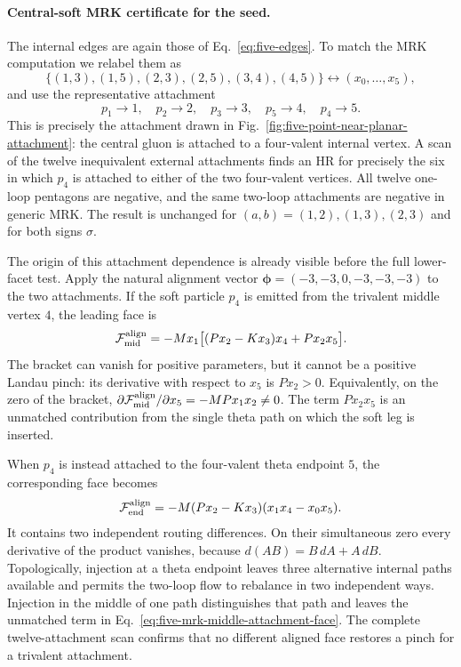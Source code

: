 \documentclass[a4paper,11pt]{article}
\begin{document}
\paragraph{Central-soft MRK certificate for the seed.}

The internal edges are again those of Eq.~\eqref{eq:five-edges}.  To match
the MRK computation we relabel them as
\begin{equation}
 \{(1,3),(1,5),(2,3),(2,5),(3,4),(4,5)\}
 \longleftrightarrow(x_0,\ldots,x_5),
 \label{eq:five-mrk-edges}
\end{equation}
and use the representative attachment
\begin{equation}
 p_1\to1,\quad p_2\to2,\quad p_3\to3,\quad
 p_5\to4,\quad p_4\to5.
 \label{eq:five-mrk-attachments}
\end{equation}
This is precisely the attachment drawn in
Fig.~\ref{fig:five-point-near-planar-attachment}: the central gluon is
attached to a four-valent internal vertex.  A scan of the twelve
inequivalent external attachments finds an HR
for precisely the six in which \(p_4\) is attached to either of the two
four-valent vertices.  All twelve one-loop pentagons are negative, and the
same two-loop attachments are negative in generic MRK.  The result is
unchanged for \((a,b)=(1,2),(1,3),(2,3)\) and for both signs \(\sigma\).

The origin of this attachment dependence is already visible before the
full lower-facet test.  Apply the natural alignment vector
\(\boldsymbol\phi=(-3,-3,0,-3,-3,-3)\) to the two attachments.  If the
soft particle \(p_4\) is emitted from the trivalent middle vertex \(4\), the
leading face is
\begin{equation}
 \mathcal F_{\rm mid}^{\rm align}
 =-Mx_1\big[(Px_2-Kx_3)x_4+Px_2x_5\big].
 \label{eq:five-mrk-middle-attachment-face}
\end{equation}
The bracket can vanish for positive parameters, but it cannot be a positive
Landau pinch: its derivative with respect to \(x_5\) is \(Px_2>0\).
Equivalently, on the zero of the bracket,
\(\partial\mathcal F_{\rm mid}^{\rm align}/\partial x_5=-MPx_1x_2\ne0\).
The term \(Px_2x_5\) is an unmatched contribution from the single theta
path on which the soft leg is inserted.

When \(p_4\) is instead attached to the four-valent theta endpoint \(5\),
the corresponding face becomes
\begin{equation}
 \mathcal F_{\rm end}^{\rm align}
 =-M(Px_2-Kx_3)(x_1x_4-x_0x_5).
 \label{eq:five-mrk-endpoint-attachment-face}
\end{equation}
It contains two independent routing differences.  On their simultaneous
zero every derivative of the product vanishes, because
\(d(AB)=B\,dA+A\,dB\).  Topologically, injection at a theta endpoint leaves
three alternative internal paths available and permits the two-loop flow to
rebalance in two independent ways.  Injection in the middle of one path
distinguishes that path and leaves the unmatched term in
Eq.~\eqref{eq:five-mrk-middle-attachment-face}.  The complete twelve-attachment
scan confirms that no different aligned face restores a pinch for a
trivalent attachment.
\end{document}
